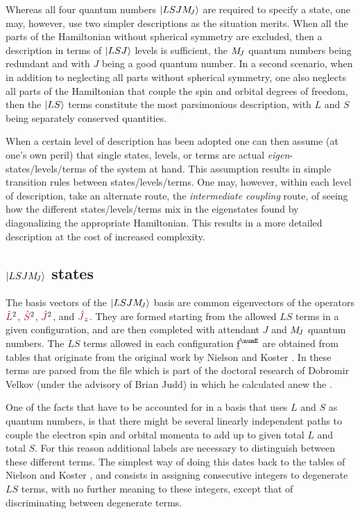 \documentclass[11pt, twoside,openright]{article}
\begin{document}
Whereas all four quantum numbers $|LSJM_{\!{J}}\rangle$ are required to specify a state, one may, however, use two simpler descriptions as the situation merits. When all the parts of the Hamiltonian without spherical symmetry are excluded, then a description in terms of $|LSJ\rangle$ levels is sufficient, the $M_{\!{J}}$ quantum numbers being redundant and with $J$ being a good quantum number. In a second scenario, when in addition to neglecting all parts without spherical symmetry, one also neglects all parts of the Hamiltonian that couple the spin and orbital degrees of freedom, then the $|LS\rangle$ terms constitute the most parsimonious description, with $L$ and $S$ being separately conserved quantities.

When a certain level of description has been adopted one can then assume (at one's own peril) that single states, levels, or terms are actual \textit{eigen}-states/levels/terms of the system at hand. This assumption results in simple transition rules between states/levels/terms. One may, however, within each level of description, take an alternate route, the \textit{intermediate coupling} route, of seeing how the different states/levels/terms mix in the eigenstates found by diagonalizing the appropriate Hamiltonian. This results in a more detailed description at the cost of increased complexity.

\subsection{$|LSJM_{\!{J}}\rangle$ states}

The basis vectors of the $|LSJM_{\!{J}}\rangle$ basis are common eigenvectors of the operators $\textcolor{purple}{\hat{L}}^2$, $\textcolor{purple}{\hat{S}}^2$, $\textcolor{purple}{\hat{J}}^2$, and $\textcolor{purple}{\hat{J}}_z$. They are formed starting from the allowed $LS$ terms in a given configuration, and are then completed with attendant $J$ and $M_{\!{J}}$ quantum numbers. The $LS$ terms allowed in each configuration $\forb^\numE$ are obtained from tables that originate from the original work by Nielson and Koster \cite{nielson_spectroscopic_1963}. In \qlanth these terms are parsed from the file  which is part of the doctoral research of Dobromir Velkov (under the advisory of Brian Judd) \cite{velkov_multi-electron_2000} in which he calculated anew the \cfps. 

One of the facts that have to be accounted for in a basis that uses $L$ and $S$ as quantum numbers, is that there might be several linearly independent paths to couple the electron spin and orbital momenta to add up to given total $L$ and total $S$. For this reason additional labels are necessary to distinguish between these different terms. The simplest way of doing this dates back to the tables of Nielson and Koster \cite{nielson_spectroscopic_1963}, and consists in assigning consecutive integers to degenerate $LS$ terms, with no further meaning to these integers, except that of discriminating between degenerate terms. 
 
\end{document}

